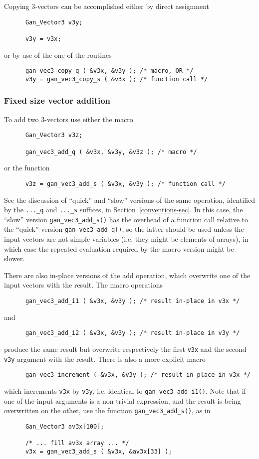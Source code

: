 Copying 3-vectors can be accomplished either by direct assignment
\begin{verbatim}
      Gan_Vector3 v3y;

      v3y = v3x;
\end{verbatim}
or by use of the one of the routines
\begin{verbatim}
      gan_vec3_copy_q ( &v3x, &v3y ); /* macro, OR */
      v3y = gan_vec3_copy_s ( &v3x ); /* function call */
\end{verbatim}

\subsubsection{Fixed size vector addition}
To add two 3-vectors use either the macro
\begin{verbatim}
      Gan_Vector3 v3z;

      gan_vec3_add_q ( &v3x, &v3y, &v3z ); /* macro */
\end{verbatim}
or the function
\begin{verbatim}
      v3z = gan_vec3_add_s ( &v3x, &v3y ); /* function call */
\end{verbatim}
See the discussion of ``quick'' and ``slow'' versions of the same operation,
identified by the {\tt ...\_q} and {\tt ...\_s} suffices,
in Section~\ref{conventions-sec}. In this case, the ``slow'' version
{\tt gan\_vec3\_add\_s()} has the overhead of a function call relative
to the ``quick'' version {\tt gan\_vec3\_add\_q()}, so the latter should
be used unless the input vectors are not simple variables (i.e. they might
be elements of arrays), in which case the repeated evaluation required
by the macro version might be slower.

There are also in-place versions of the add operation, which overwrite one
of the input vectors with the result. The macro operations
\begin{verbatim}
      gan_vec3_add_i1 ( &v3x, &v3y ); /* result in-place in v3x */
\end{verbatim}
and
\begin{verbatim}
      gan_vec3_add_i2 ( &v3x, &v3y ); /* result in-place in v3y */
\end{verbatim}
produce the same result but overwrite respectively the first {\tt v3x}
and the second {\tt v3y} argument with the result. There is also a
more explicit macro
\begin{verbatim}
      gan_vec3_increment ( &v3x, &v3y ); /* result in-place in v3x */
\end{verbatim}
which increments {\tt v3x} by {\tt v3y}, i.e. identical to
{\tt gan\_vec3\_add\_i1()}. Note that if one of the input arguments is
a non-trivial expression, and the result is being overwritten on the other,
use the function {\tt gan\_vec3\_add\_s()}, as in
\begin{verbatim}
      Gan_Vector3 av3x[100];

      /* ... fill av3x array ... */
      v3x = gan_vec3_add_s ( &v3x, &av3x[33] );
\end{verbatim}

